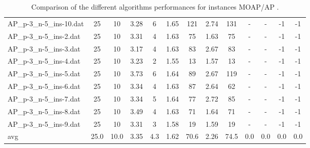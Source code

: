 \begin{table}[!ht]
{\begin{tabular}{lcccccccccccc}
AP\_p-3\_n-5\_ins-10.dat & 25 & 10 & 3.28 & 6 & 1.65 & 121 & 2.74 & 131 &  - &  - & -1 & -1 \\
AP\_p-3\_n-5\_ins-2.dat & 25 & 10 & 3.31 & 4 & 1.63 & 75 & 1.63 & 75 &  - &  - & -1 & -1 \\
AP\_p-3\_n-5\_ins-3.dat & 25 & 10 & 3.17 & 4 & 1.63 & 83 & 2.67 & 83 &  - &  - & -1 & -1 \\
AP\_p-3\_n-5\_ins-4.dat & 25 & 10 & 3.23 & 2 & 1.55 & 13 & 1.57 & 13 &  - &  - & -1 & -1 \\
AP\_p-3\_n-5\_ins-5.dat & 25 & 10 & 3.73 & 6 & 1.64 & 89 & 2.67 & 119 &  - &  - & -1 & -1 \\
AP\_p-3\_n-5\_ins-6.dat & 25 & 10 & 3.34 & 4 & 1.63 & 87 & 2.64 & 62 &  - &  - & -1 & -1 \\
AP\_p-3\_n-5\_ins-7.dat & 25 & 10 & 3.34 & 5 & 1.64 & 77 & 2.72 & 85 &  - &  - & -1 & -1 \\
AP\_p-3\_n-5\_ins-8.dat & 25 & 10 & 3.49 & 4 & 1.63 & 71 & 1.64 & 71 &  - &  - & -1 & -1 \\
AP\_p-3\_n-5\_ins-9.dat & 25 & 10 & 3.31 & 3 & 1.58 & 19 & 1.59 & 19 &  - &  - & -1 & -1 \\
\hline avg & 25.0 & 10.0 &  3.35 & 4.3 &  1.62 & 70.6 &  2.26 & 74.5 &  0.0 & 0.0 &  0.0 & 0.0 \\ \hline
\bottomrule
\end{tabular}
}%
\caption{Comparison of the different algorithms performances for instances MOAP/AP .}
\end{table}
